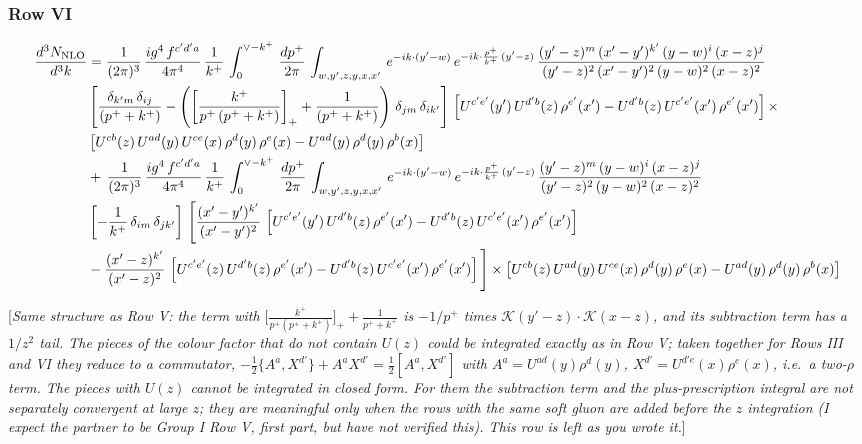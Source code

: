 \documentclass[9pt]{article}
\numberwithin{equation}{section}
\newcommand{\rnote}[1]{{\color{teal}[\textit{#1}]}}
\begin{document}
\subsubsection{Row VI}
\begin{align}
    \frac{d^{3}N_{\rm NLO}}{d^{3}k} & =  \frac{1}{(2\pi)^{3}}\, \frac{ig^{4}\,f^{c'd'a}}{4\pi^{4}}\, \frac{1}{k^{+}}\,\int_{0}^{\vee-k^{+}}\, \frac{dp^{+}}{2\pi}\, \int_{w,y',z,y,x,x'}\, e^{-ik\cdot (y'-w)}\, e^{-ik\cdot \frac{p^{+}}{k^{+}}\,(y'-z)}\,\frac{(y'-z)^{m}\,(x'-y')^{k'}\,(y-w)^{i}\,(x-z)^{j}}{(y'-z)^{2}\,(x'-y')^{2}\,(y-w)^{2}\,(x-z)^{2}}\notag \\ & \left[\frac{\delta_{k'm}\,\delta_{ij}}{(p^{+}+k^{+})}-\left(\left[\frac{k^{+}}{p^{+}\,(p^{+}+k^{+})}\right]_{+}+\frac{1}{(p^{+}+k^{+})}\right)\,\delta_{jm}\,\delta_{ik'}\right]\, \left[U^{c'e'}(y')\,U^{d'b}(z)\,\rho^{e'}(x')-U^{d'b}(z)\,U^{c'e'}(x')\,\rho^{e'}(x')\right]\times\notag \\ &  \left[U^{cb}(z)\,U^{ad}(y)\,U^{ce}(x)\,\rho^{d}(y)\,\rho^{e}(x)-U^{ad}(y)\,\rho^{d}(y)\,\rho^{b}(x)\right] \notag \\ &  +\,\frac{1}{(2\pi)^{3}}\, \frac{ig^{4}\,f^{c'd'a}}{4\pi^{4}}\, \frac{1}{k^{+}}\,\int_{0}^{\vee-k^{+}}\, \frac{dp^{+}}{2\pi}\, \int_{w,y',z,y,x,x'}\, e^{-ik\cdot (y'-w)}\, e^{-ik\cdot \frac{p^{+}}{k^{+}}\,(y'-z)}\,\frac{(y'-z)^{m}\,(y-w)^{i}\,(x-z)^{j}}{(y'-z)^{2}\,(y-w)^{2}\,(x-z)^{2}}\notag \\ &  \left[-\frac{1}{k^{+}}\, \delta_{im}\, \delta_{jk'}\right]\, \Bigg[\frac{(x'-y')^{k'}}{(x'-y')^{2}}\,\left[U^{c'e'}(y')\,U^{d'b}(z)\,\rho^{e'}(x')-U^{d'b}(z)\,U^{c'e'}(x')\,\rho^{e'}(x')\right]\notag \\ & -\frac{(x'-z)^{k'}}{(x'-z)^{2}}\,\left[U^{c'e'}(z)\,U^{d'b}(z)\,\rho^{e'}(x')-U^{d'b}(z)\,U^{c'e'}(x')\,\rho^{e'}(x')\right]\Bigg]\times    \left[U^{cb}(z)\,U^{ad}(y)\,U^{ce}(x)\,\rho^{d}(y)\,\rho^{e}(x)-U^{ad}(y)\,\rho^{d}(y)\,\rho^{b}(x)\right]
\end{align}

\rnote{Same structure as Row V: the term with $\big[\frac{k^{+}}{p^{+}(p^{+}+k^{+})}\big]_{+}+\frac{1}{p^{+}+k^{+}}$ is $-1/p^{+}$ times $\mathcal{K}(y'-z)\cdot\mathcal{K}(x-z)$, and its subtraction term has a $1/z^{2}$ tail. The pieces of the colour factor that do not contain $U(z)$ could be integrated exactly as in Row V; taken together for Rows III and VI they reduce to a commutator, $-\frac{1}{2}\{A^{a},X^{d'}\}+A^{a}X^{d'}=\frac{1}{2}[A^{a},X^{d'}]$ with $A^{a}=U^{ad}(y)\rho^{d}(y)$, $X^{d'}=U^{d'e}(x)\rho^{e}(x)$, i.e.\ a two-$\rho$ term. The pieces with $U(z)$ cannot be integrated in closed form. For them the subtraction term and the plus-prescription integral are not separately convergent at large $z$; they are meaningful only when the rows with the same soft gluon are added before the $z$ integration (I expect the partner to be Group I Row V, first part, but have not verified this). This row is left as you wrote it.}
\end{document}
